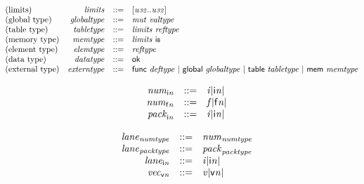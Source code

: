 \vspace{1ex}

$$
\begin{array}{@{}lrrl@{}l@{}}
\mbox{(limits)} & {\mathit{limits}} &::=& {}[{\mathit{u{\scriptstyle32}}} .. {\mathit{u{\scriptstyle32}}}] \\
\mbox{(global type)} & {\mathit{globaltype}} &::=& {\mathit{mut}}~{\mathit{valtype}} \\
\mbox{(table type)} & {\mathit{tabletype}} &::=& {\mathit{limits}}~{\mathit{reftype}} \\
\mbox{(memory type)} & {\mathit{memtype}} &::=& {\mathit{limits}}~\mathsf{i{\scriptstyle8}} \\
\mbox{(element type)} & {\mathit{elemtype}} &::=& {\mathit{reftype}} \\
\mbox{(data type)} & {\mathit{datatype}} &::=& \mathsf{ok} \\
\mbox{(external type)} & {\mathit{externtype}} &::=& \mathsf{func}~{\mathit{deftype}} ~|~ \mathsf{global}~{\mathit{globaltype}} ~|~ \mathsf{table}~{\mathit{tabletype}} ~|~ \mathsf{mem}~{\mathit{memtype}} \\
\end{array}
$$

\vspace{1ex}

\vspace{1ex}

\vspace{1ex}

$$
\begin{array}{@{}lrrl@{}l@{}}
& {{\mathit{num}}}_{{\mathsf{i}}{{\mathit{n}}}} &::=& {{\mathit{i}}}{{|{\mathsf{i}}{{\mathit{n}}}|}} \\
& {{\mathit{num}}}_{{\mathsf{f}}{{\mathit{n}}}} &::=& {{\mathit{f}}}{{|{\mathsf{f}}{{\mathit{n}}}|}} \\
& {{\mathit{pack}}}_{{\mathsf{i}}{{\mathit{n}}}} &::=& {{\mathit{i}}}{{|{\mathsf{i}}{{\mathit{n}}}|}} \\
\end{array}
$$

$$
\begin{array}{@{}lrrl@{}l@{}}
& {{\mathit{lane}}}_{{\mathit{numtype}}} &::=& {{\mathit{num}}}_{{\mathit{numtype}}} \\
& {{\mathit{lane}}}_{{\mathit{packtype}}} &::=& {{\mathit{pack}}}_{{\mathit{packtype}}} \\
& {{\mathit{lane}}}_{{\mathsf{i}}{{\mathit{n}}}} &::=& {{\mathit{i}}}{{|{\mathsf{i}}{{\mathit{n}}}|}} \\
& {{\mathit{vec}}}_{{\mathsf{v}}{{\mathit{n}}}} &::=& {{\mathit{v}}}{{|{\mathsf{v}}{{\mathit{n}}}|}} \\
\end{array}
$$

